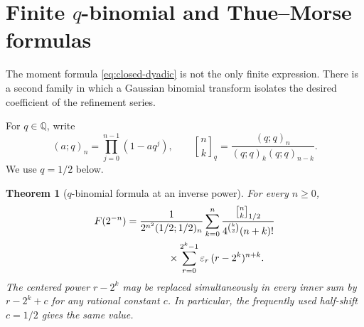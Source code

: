 \documentclass[11pt,oneside]{article}
\newtheorem{theorem}{Theorem}[section]
\theoremstyle{definition}
\theoremstyle{remark}
\newcommand{\epsTM}{\varepsilon}
\newcommand{\Q}{\mathbb Q}
\newcommand{\gaussbinom}[3]{\genfrac{[}{]}{0pt}{}{#1}{#2}_{#3}}
\begin{document}
\section{Finite \texorpdfstring{$q$}{q}-binomial and Thue--Morse formulas}\label{sec:q-binomial}

The moment formula \eqref{eq:closed-dyadic} is not the only finite expression.
There is a second family in which a Gaussian binomial transform isolates the desired
coefficient of the refinement series.

For $q\in\Q$, write
\begin{equation}\label{eq:q-pochhammer}
  (a;q)_n=\prod_{j=0}^{n-1}(1-aq^j),
  \qquad
  \gaussbinom{n}{k}{q}=\frac{(q;q)_n}{(q;q)_k(q;q)_{n-k}}.
\end{equation}
We use $q=1/2$ below.

\begin{theorem}[$q$-binomial formula at an inverse power]\label{thm:q-inverse-power}
For every $n\ge0$,
\begin{equation}\label{eq:q-inverse-power}
\begin{split}
 F(2^{-n})={}&
 \frac{1}{2^{n^2}(1/2;1/2)_n}
 \sum_{k=0}^{n}
 \frac{\gaussbinom{n}{k}{1/2}}
 {4^{\binom k2}(n+k)!}\\
 &\hspace{1.0cm}\times
 \sum_{r=0}^{2^k-1}\epsTM_r\,(r-2^k)^{n+k}.
\end{split}
\end{equation}
The centered power $r-2^k$ may be replaced simultaneously in every inner sum by
$r-2^k+c$ for any rational constant $c$.  In particular, the frequently used
half-shift $c=1/2$ gives the same value.
\end{theorem}
\end{document}

